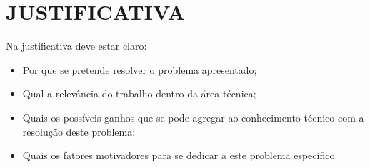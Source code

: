 
\chapter{JUSTIFICATIVA}
\label{chap:justificativa}

Na justificativa deve estar claro:

\begin{itemize}
    \item Por que se pretende resolver o problema apresentado;
    \item Qual a relevância do trabalho dentro da área técnica;   
    \item Quais os possíveis ganhos que se pode agregar ao conhecimento técnico com a resolução deste problema;
		\item Quais os fatores motivadores para se dedicar a este problema específico.
\end{itemize}
